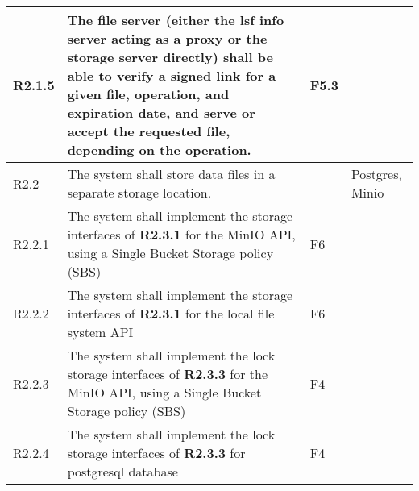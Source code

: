 \begin{landscape}
\begin{longtable}{|p{1cm}|p{19cm}|p{2cm}|p{3cm}|}
        \rowcolor[HTML]{EEFFEE}        R2.1.5     & The file server (either the lsf info server acting as a proxy or the storage server directly) shall be able to verify a signed link for a given file, operation, and expiration date, and serve or accept the requested file, depending on the operation.                             & F5.3                  &                                          \\ \hline
        \rowcolor[HTML]{DDDDDD}        R2.2       & The system shall store data files in a separate storage location.                                                                                                                                                                                                                     &                       & Postgres, Minio                          \\ \hline
        \rowcolor[HTML]{EEFFEE}        R2.2.1     & The system shall implement the storage interfaces of \textbf{R2.3.1} for the MinIO API, using a Single Bucket Storage policy (SBS)                                                                                                                                                    & F6                    &                                          \\\hline
        \rowcolor[HTML]{FFEEEE}        R2.2.2     & The system shall implement the storage interfaces of \textbf{R2.3.1} for the local file system API                                                                                                                                                                                    & F6                    &                                          \\\hline
        \rowcolor[HTML]{FFEEEE}        R2.2.3     & The system shall implement the lock storage interfaces of \textbf{R2.3.3} for the MinIO API, using a Single Bucket Storage policy (SBS)                                                                                                                                               & F4                    &                                          \\\hline
        \rowcolor[HTML]{FFEEEE}        R2.2.4     & The system shall implement the lock storage interfaces of \textbf{R2.3.3} for postgresql database                                                                                                                                                                                     & F4                    &                                          \\\hline

\end{longtable}
\end{landscape}
